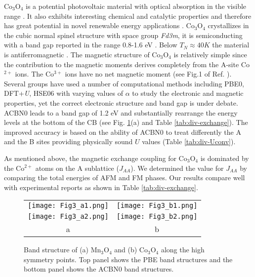 \documentclass[12pt,a4paper,final]{iopart}
\begin{document}
Co$_3$O$_4$ is a potential photovoltaic material with optical absorption in the visible range \cite{qiao2013nature,xie2009low}. It also exhibits interesting chemical and catalytic properties and therefore has great potential in novel renewable energy applications \cite{qiao2013nature}. 
Co$_3$O$_4$ crystallizes in the cubic normal spinel structure with space group \textit{Fd3m}, it is semiconducting with a band gap reported in the range 0.8-1.6 eV \cite{qiao2013nature,kim2003optical,waegele2014long}. Below $T_N \approx 40K $ the material is antiferromagnetic \cite{roth1964magnetic}. The magnetic structure of Co$_3$O$_4$ is relatively simple since the contribution to the magnetic moments derives completely from the A-site Co$^{2+}$ ions. The Co$^{3+}$ ions have no net magnetic moment (see Fig.1 of Ref. \cite{singh2014putting}).
Several groups have used a number of computational methods including PBE0, DFT+\textit{U}\cite{chen2011electronic}, HSE06 with varying values of $\alpha$ \cite{singh2014putting} to study the electronic and magnetic properties, yet the correct electronic structure and band gap is under debate. 
ACBN0 leads to a band gap of 1.2 eV and substantially rearrange the energy levels at the bottom of the CB (see Fig. \ref{fig:TMO-band}(a) and Table \ref{tab:div-exchange}). 
The improved accuracy is based on the ability of ACBN0 to treat differently the A and the B sites providing physically sound  $U$ values (Table \ref{tab:div-Uconv}).

As mentioned above, the magnetic exchange coupling for Co$_3$O$_4$ is dominated by the Co$^{2+}$ atoms on the A sublattice ($J_{AA}$). We determined the value for $J_{AA}$ by comparing the total energies of AFM and FM phases. Our results compare well with experimental reports as shown in Table \ref{tab:div-exchange}. 

\begin{figure}[htb!]
\centering
\footnotesize
\centering
\captionsetup{width=\linewidth}
\begin{tabular}{cc}
\texttt{[image: Fig3\_a1.png]} &  \texttt{[image: Fig3\_b1.png]} \\
\texttt{[image: Fig3\_a2.png]} & \texttt{[image: Fig3\_b2.png]} \\
a & b\\
\end{tabular}
\caption{Band structure of (a) Mn$_3$O$_4$ and (b) Co$_3$O$_4$ along the high symmetry points. Top panel shows the PBE band structures and the bottom panel shows the ACBN0 band structures.}
\label{fig:TMO-band}
\end{figure}
\normalsize
\end{document}
